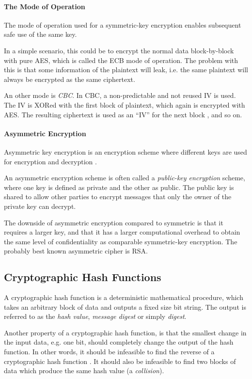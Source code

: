 \documentclass[pdftex,english,10pt,b5paper,twoside]{book}
\begin{document}
\paragraph{The Mode of Operation} The mode of operation used for a
symmetric-key encryption enables subsequent safe use of the same key.

In a simple scenario, this could be to encrypt the normal data block-by-block
with pure \ac{AES}, which is called the \ac{ECB} mode of operation. The problem
with this is that some information of the plaintext will leak, i.e. the same
plaintext will always be encrypted as the same ciphertext.

An other mode is \emph{\ac{CBC}}. In \ac{CBC}, a non-predictable and not reused
\ac{IV} is used. The \ac{IV} is XORed with the first block of plaintext, which
again is encrypted with \ac{AES}. The resulting ciphertext is used as an
``\ac{IV}'' for the next block \cite[p. 183]{stallings}, and so on.

\paragraph{Asymmetric Encryption} Asymmetric key encryption is an encryption scheme
where different keys are used for encryption and decryption
\cite[p. 259]{stallings}.

An asymmetric encryption scheme is often called a \emph{public-key
encryption} scheme, where one key is defined as private and the other as public.
The public key is shared to allow other parties to encrypt messages that only the
owner of the private key can decrypt.

The downside of asymmetric encryption compared to symmetric is that it requires
a larger key, and that it has a larger computational overhead to obtain the
same level of confidentiality as comparable symmetric-key encryption. The
probably best known asymmetric cipher is \ac{RSA}.

\subsection{Cryptographic Hash Functions}

A cryptographic hash function is a deterministic mathematical procedure, which
takes an arbitrary block of data and outputs a fixed size bit string. The
output is referred to as the \emph{hash value}, \emph{message digest} or simply
\emph{digest}.

Another property of a cryptographic hash function, is that the
smallest change in the input data, e.g. one bit, should completely change the
output of the hash function. In other words, it should be infeasible to find the
reverse of a cryptographic hash function \cite[p. 335]{stallings}. It should
also be infeasible to find two blocks of data which produce the same hash value
(a \emph{collision}).
\end{document}
